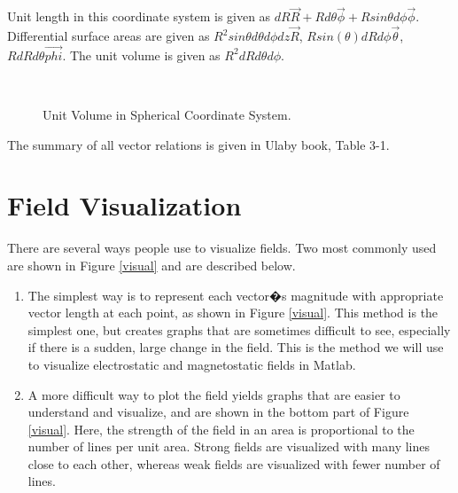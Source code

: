 \begin{description}




Unit length in this coordinate system is given as $dR \vec{R} + R d\theta \vec{\phi} + R sin{\theta}d\phi \vec{\phi}$. Differential surface areas are given as $R^2 sin{\theta} d\theta d\phi dz \vec{R}$, $R sin(\theta)dR d\phi \vec{\theta}$, $R dR d\theta \vec{phi}$. The unit volume is given as $R^2 dR d\theta  d\phi$.


\begin{figure}[htbp]
\begin{center}
\strut{} \\
\end{center}
\caption{Unit Volume in Spherical Coordinate System.}
\label{sphersyst}
\end{figure}




The summary of all vector relations is given in Ulaby book, Table 3-1.



\end{description}

\section{Field Visualization}
There are several ways people use to visualize fields. Two most commonly used are shown in Figure \ref{visual} and are described below.
\begin{enumerate}
\item The simplest way is to represent each vector�s magnitude with appropriate vector length at each point, as shown in Figure \ref{visual}. This method is the simplest one, but creates graphs that are sometimes difficult to see, especially if there is a sudden, large change in the field.  This is the method we will use to visualize electrostatic and magnetostatic fields in Matlab.
\item A more difficult way to plot the field yields graphs that are easier to understand and visualize, and are shown in the bottom part of Figure \ref{visual}. Here, the strength of the field in an area is proportional to the number of lines per unit area. Strong fields are visualized with many lines close to each other, whereas weak fields are visualized with fewer number of lines. 
\end{enumerate}

